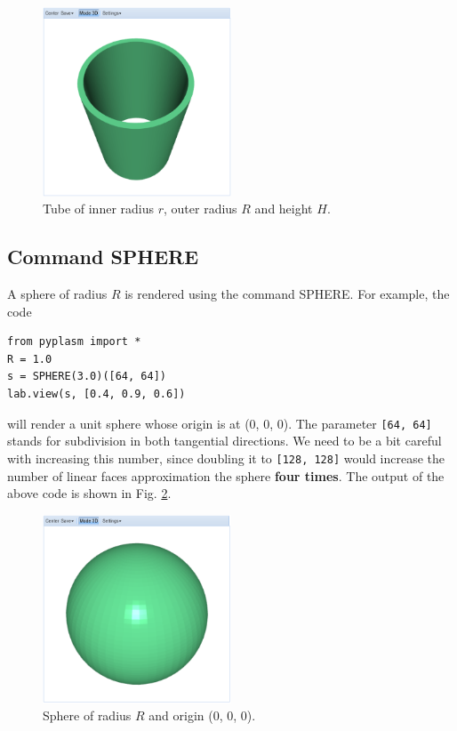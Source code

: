 \documentclass{article}
\begin{document}
\begin{figure}[!ht]
\begin{center}
\includegraphics[width=0.5\textwidth]{img/tube-1.png}
\end{center}
\vspace{-2mm}
\caption{Tube of inner radius $r$, outer radius $R$ and height $H$.}
\label{fig:tube-1}
\end{figure}

\subsection{Command SPHERE}

A sphere of radius $R$ is rendered using the command SPHERE.
For example, the code

\begin{verbatim}
from pyplasm import *
R = 1.0
s = SPHERE(3.0)([64, 64])
lab.view(s, [0.4, 0.9, 0.6])
\end{verbatim}
will render a unit sphere whose origin is at (0, 0, 0). 
The parameter {\tt [64, 64]} stands for 
subdivision in both tangential directions. We need to be a bit 
careful with increasing this number, since doubling it to 
{\tt [128, 128]} would increase 
the number of linear faces approximation the sphere {\bf four times}.
The output of the above code is shown in Fig. \ref{fig:sphere-1}.

\newpage

\begin{figure}[!ht]
\begin{center}
\includegraphics[width=0.5\textwidth]{img/sphere-1.png}
\end{center}
\vspace{-2mm}
\caption{Sphere of radius $R$ and origin (0, 0, 0).}
\label{fig:sphere-1}
\end{figure}
\end{document}

